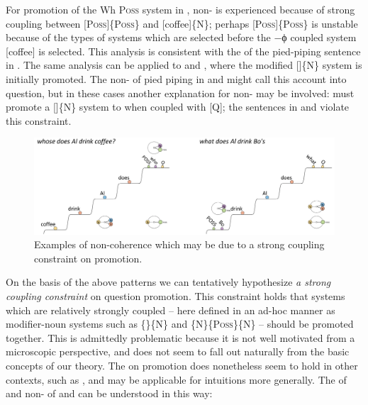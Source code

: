 For promotion of the {\textbar}Wh P\textsc{oss}{\textbar} system in , non- is experienced because of strong coupling between [P\textsc{oss}]\linebreak\{P\textsc{oss}\} and [coffee]\{N\}; perhaps [P\textsc{oss}]\{P\textsc{oss}\} is unstable because of the types of systems which are selected before the −ϕ coupled system [coffee] is selected. This analysis is consistent with the  of the pied-piping sentence in . The same analysis can be applied to  and , where the modified []\{N\} system is initially promoted. The non- of pied piping in  and  might call this account into question, but in these cases another explanation for non- may be involved:  must promote a []\{N\} system to  when coupled with [Q]; the sentences in  and  violate this constraint. 

  
\begin{figure}
\includegraphics[width=\textwidth]{figures/Tilsen-img166.png}
\caption{Examples of non-coherence which may be due to a strong coupling constraint on promotion.}
\label{fig:7:22}
\end{figure}
 

  On the basis of the above patterns we can tentatively hypothesize \textit{a strong coupling constraint} on question promotion. This constraint holds that systems which are relatively strongly coupled -- here defined in an ad-hoc manner as modifier-noun systems such as \{\}\{N\} and \{N\}\{P\textsc{oss}\}\{N\} -- should be promoted together. This is admittedly problematic because it is not well motivated from a microscopic perspective, and does not seem to fall out naturally from the basic concepts of our theory. The  on promotion does nonetheless seem to hold in other contexts, such as , and may be applicable for  intuitions more generally. The  of  and non- of  and  can be understood in this way:

